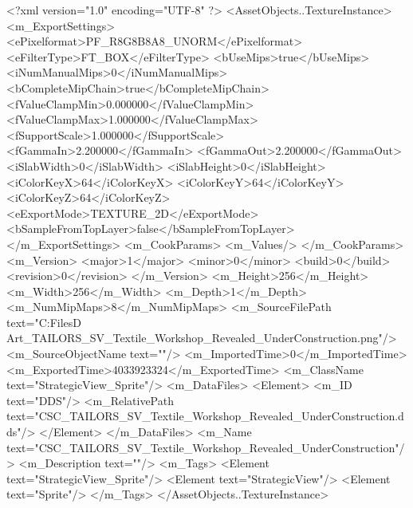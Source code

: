 <?xml version="1.0" encoding="UTF-8" ?>
<AssetObjects..TextureInstance>
	<m_ExportSettings>
		<ePixelformat>PF_R8G8B8A8_UNORM</ePixelformat>
		<eFilterType>FT_BOX</eFilterType>
		<bUseMips>true</bUseMips>
		<iNumManualMips>0</iNumManualMips>
		<bCompleteMipChain>true</bCompleteMipChain>
		<fValueClampMin>0.000000</fValueClampMin>
		<fValueClampMax>1.000000</fValueClampMax>
		<fSupportScale>1.000000</fSupportScale>
		<fGammaIn>2.200000</fGammaIn>
		<fGammaOut>2.200000</fGammaOut>
		<iSlabWidth>0</iSlabWidth>
		<iSlabHeight>0</iSlabHeight>
		<iColorKeyX>64</iColorKeyX>
		<iColorKeyY>64</iColorKeyY>
		<iColorKeyZ>64</iColorKeyZ>
		<eExportMode>TEXTURE_2D</eExportMode>
		<bSampleFromTopLayer>false</bSampleFromTopLayer>
	</m_ExportSettings>
	<m_CookParams>
		<m_Values/>
	</m_CookParams>
	<m_Version>
		<major>1</major>
		<minor>0</minor>
		<build>0</build>
		<revision>0</revision>
	</m_Version>
	<m_Height>256</m_Height>
	<m_Width>256</m_Width>
	<m_Depth>1</m_Depth>
	<m_NumMipMaps>8</m_NumMipMaps>
	<m_SourceFilePath text="C:\Users\Shadow\Desktop\Working Files\2D Art\Quarters\Tailors\StrategicView\CSC_TAILORS_SV_Textile_Workshop_Revealed_UnderConstruction.png"/>
	<m_SourceObjectName text=""/>
	<m_ImportedTime>0</m_ImportedTime>
	<m_ExportedTime>4033923324</m_ExportedTime>
	<m_ClassName text="StrategicView_Sprite"/>
	<m_DataFiles>
		<Element>
			<m_ID text="DDS"/>
			<m_RelativePath text="CSC_TAILORS_SV_Textile_Workshop_Revealed_UnderConstruction.dds"/>
		</Element>
	</m_DataFiles>
	<m_Name text="CSC_TAILORS_SV_Textile_Workshop_Revealed_UnderConstruction"/>
	<m_Description text=""/>
	<m_Tags>
		<Element text="StrategicView_Sprite"/>
		<Element text="StrategicView"/>
		<Element text="Sprite"/>
	</m_Tags>
</AssetObjects..TextureInstance>

